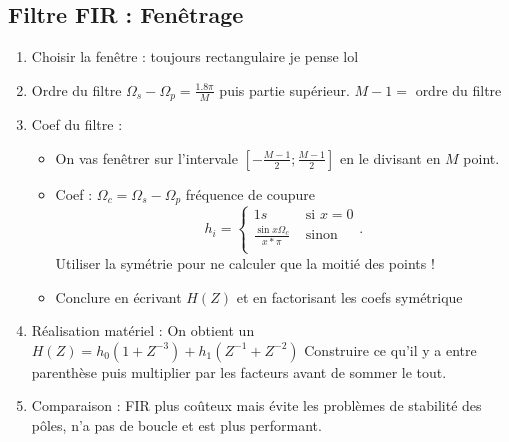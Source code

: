 \documentclass{article}
\begin{document}
\subsection{Filtre FIR : Fenêtrage}
\begin{enumerate}
    \item Choisir la fenêtre : toujours rectangulaire je pense lol
    \item Ordre du filtre $ \Omega _s - \Omega _p = \frac{1.8 \pi }{M} $ puis partie supérieur. $ M - 1 =  $ ordre du filtre
    \item Coef du filtre : \begin{itemize}
        \item On vas fenêtrer sur l'intervale $ [-\frac{M-1}{2} ; \frac{M-1}{2}] $ en le divisant en $ M $ point.
        \item Coef : $ \Omega _c = \Omega _s - \Omega _p $ fréquence de coupure 
        \[
            h_i = \begin{cases}
                1s &\text{ si } x = 0\\
                \frac{\sin x \Omega _c}{x*\pi } &\text{ sinon}\\
                \end{cases}  
        .\]
        Utiliser la symétrie pour ne calculer que la moitié des points !
        \item Conclure en écrivant $ H(Z) $ et en factorisant les coefs symétrique
    \end{itemize}
    \item Réalisation matériel : On obtient un $ H(Z) = h_0(1+Z^{-3}) + h_1 (Z^{-1} + Z^{-2})$ Construire ce qu'il y a entre parenthèse puis multiplier par les facteurs avant de sommer le tout.
    \item Comparaison : FIR plus coûteux mais évite les problèmes de stabilité des pôles, n'a pas de boucle et est plus performant.
\end{enumerate}
\end{document}
